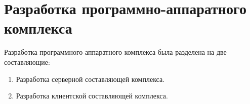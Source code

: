 \section{Разработка программно-аппаратного комплекса}

Разработка программного-аппаратного комплекса была разделена на две составляющие:

\begin{enumerate}
  \item Разработка серверной составляющей комплекса.
  \item Разработка клиентской составляющей комплекса.
\end{enumerate}






